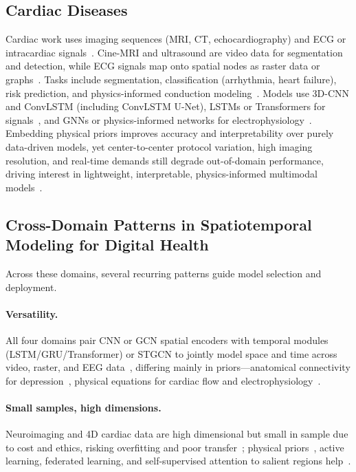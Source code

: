 \documentclass[journal]{IEEEtran}
\begin{document}
\subsection{Cardiac Diseases}
Cardiac work uses imaging sequences (MRI, CT, echocardiography) and ECG or intracardiac signals~\cite{5,6,7}. Cine-MRI and ultrasound are video data for segmentation and detection, while ECG signals map onto spatial nodes as raster data or graphs~\cite{7}. Tasks include segmentation, classification (arrhythmia, heart failure), risk prediction, and physics-informed conduction modeling~\cite{7}. Models use 3D-CNN and ConvLSTM (including ConvLSTM U-Net), LSTMs or Transformers for signals~\cite{5,6}, and GNNs or physics-informed networks for electrophysiology~\cite{7}. Embedding physical priors improves accuracy and interpretability over purely data-driven models, yet center-to-center protocol variation, high imaging resolution, and real-time demands still degrade out-of-domain performance, driving interest in lightweight, interpretable, physics-informed multimodal models~\cite{6}.

\subsection{Cross-Domain Patterns in Spatiotemporal Modeling for Digital Health}
Across these domains, several recurring patterns guide model selection and deployment.

\paragraph{Versatility.} All four domains pair CNN or GCN spatial encoders with temporal modules (LSTM/GRU/Transformer) or STGCN to jointly model space and time across video, raster, and EEG data~\cite{2,3,4,6}, differing mainly in priors---anatomical connectivity for depression~\cite{4}, physical equations for cardiac flow and electrophysiology~\cite{5,7}.

\paragraph{Small samples, high dimensions.} Neuroimaging and 4D cardiac data are high dimensional but small in sample due to cost and ethics, risking overfitting and poor transfer~\cite{4,5,6}; physical priors~\cite{7}, active learning, federated learning, and self-supervised attention to salient regions help~\cite{2,4}.
\end{document}
